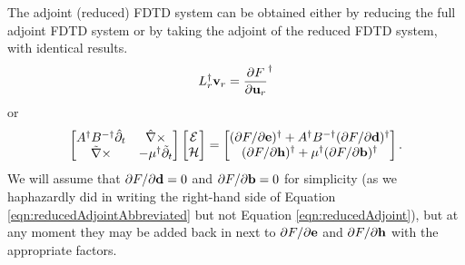 The adjoint (reduced) FDTD system can be obtained either by reducing the full adjoint FDTD system or by taking the adjoint of the reduced FDTD system, with identical results.
%
\begin{equation}
L_r^\dagger \textbf{v}_r = \frac{\partial{F}}{\partial{\textbf{u}_r}}^\dagger
\label{eqn:reducedAdjointAbbreviated}
\end{equation}
%
or
%
\begin{equation}
\begin{bmatrix}
A^\dagger B^{-\dagger} \hat{\partial}_t & \hat{\nabla} \times \\
\tilde{\nabla} \times & -\mu^\dagger \tilde{\partial}_t
\end{bmatrix}
\begin{bmatrix}
\mathcal{E} \\ \mathcal{H}
\end{bmatrix}
=
\begin{bmatrix}
(\partial{F}/\partial{\textbf{e}})^\dagger + A^\dagger B^{-\dagger} (\partial{F}/\partial{\textbf{d}})^\dagger \\
(\partial{F}/\partial{\textbf{h}})^\dagger + \mu^\dagger (\partial{F}/\partial{\textbf{b}})^\dagger
\end{bmatrix}.
\label{eqn:reducedAdjoint}
\end{equation}
%
We will assume that $\partial{F}/\partial{\textbf{d}} = 0$ and $\partial{F}/\partial{\textbf{b}} = 0$ for simplicity (as we haphazardly did in writing the right-hand side of Equation \ref{eqn:reducedAdjointAbbreviated} but not Equation \ref{eqn:reducedAdjoint}), but at any moment they may be added back in next to $\partial{F}/\partial{\textbf{e}}$ and $\partial{F}/\partial{\textbf{h}}$ with the appropriate factors.

